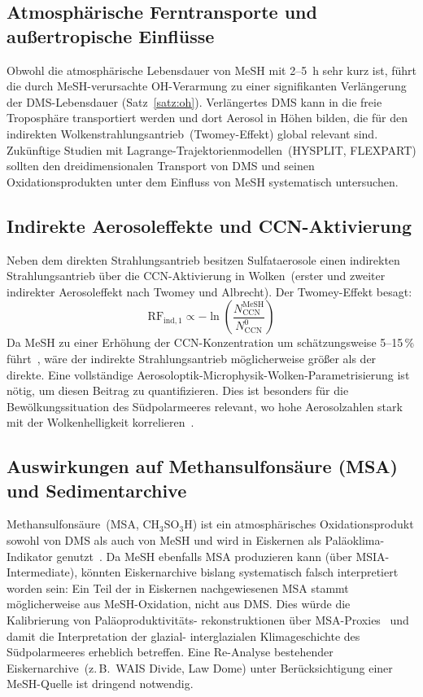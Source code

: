 ﻿\documentclass[a4paper,12pt]{article}
\theoremstyle{definition}
\begin{document}
\subsection{Atmosphärische Ferntransporte und außertropische Einflüsse}

Obwohl die atmosphärische Lebensdauer von MeSH mit 2--5~h sehr kurz ist, führt die durch
MeSH-verursachte OH-Verarmung zu einer signifikanten Verlängerung der DMS-Lebensdauer (Satz~\ref{satz:oh}).
Verlängertes DMS kann in die freie Troposphäre transportiert werden und dort Aerosol in
Höhen bilden, die für den indirekten Wolkenstrahlungsantrieb~(Twomey-Effekt) global relevant sind.
Zukünftige Studien mit Lagrange-Trajektorienmodellen~(HYSPLIT, FLEXPART) sollten den
dreidimensionalen Transport von DMS und seinen Oxidationsprodukten unter dem Einfluss von MeSH
systematisch untersuchen.

\subsection{Indirekte Aerosoleffekte und CCN-Aktivierung}

Neben dem direkten Strahlungsantrieb besitzen Sulfataerosole einen indirekten Strahlungsantrieb
über die CCN-Aktivierung in Wolken~(erster und zweiter indirekter Aerosoleffekt nach Twomey und
Albrecht). Der Twomey-Effekt besagt:
\[
  \mathrm{RF}_{\mathrm{ind,1}} \propto -\ln\left(\frac{N_{\mathrm{CCN}}^{\mathrm{MeSH}}}{N_{\mathrm{CCN}}^0}\right)
\]
Da MeSH zu einer Erhöhung der CCN-Konzentration um schätzungsweise 5--15\,\% führt~\cite{wohl2024},
wäre der indirekte Strahlungsantrieb möglicherweise größer als der direkte. Eine vollständige
Aerosoloptik-Microphysik-Wolken-Parametrisierung ist nötig, um diesen Beitrag zu quantifizieren.
Dies ist besonders für die Bewölkungssituation des Südpolarmeeres relevant, wo hohe Aerosolzahlen
stark mit der Wolkenhelligkeit korrelieren~\cite{mccoy2015}.

\subsection{Auswirkungen auf Methansulfonsäure (MSA) und Sedimentarchive}

Methansulfonsäure~(MSA, \(\mathrm{CH_3SO_3H}\)) ist ein atmosphärisches Oxidationsprodukt sowohl
von DMS als auch von MeSH und wird in Eiskernen als Paläoklima-Indikator genutzt~\cite{legrand1988}.
Da MeSH ebenfalls MSA produzieren kann (über MSIA-Intermediate), könnten Eiskernarchive bislang
systematisch falsch interpretiert worden sein: Ein Teil der in Eiskernen nachgewiesenen MSA stammt
möglicherweise aus MeSH-Oxidation, nicht aus DMS. Dies würde die Kalibrierung von Paläoproduktivitäts-
rekonstruktionen über MSA-Proxies~\cite{curran2003} und damit die Interpretation der glazial-
interglazialen Klimageschichte des Südpolarmeeres erheblich betreffen. Eine Re-Analyse bestehender
Eiskernarchive~(z.\,B.\ WAIS Divide, Law Dome) unter Berücksichtigung einer MeSH-Quelle ist dringend
notwendig.
\end{document}

